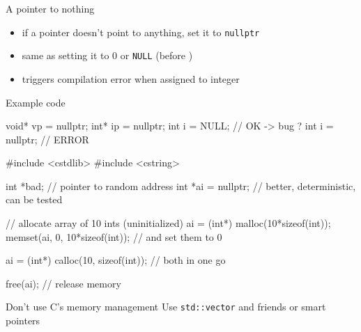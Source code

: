 \begin{frame}[fragile]
  \begin{block}{A pointer to nothing}
    \begin{itemize}
    \item if a pointer doesn't point to anything, set it to \texttt{nullptr}
    \item same as setting it to 0 or \texttt{NULL} (before )
    \item triggers compilation error when assigned to integer
    \end{itemize}
  \end{block}
  \pause
  \begin{exampleblock}{Example code}
    \begin{cppcode*}{}
      void* vp = nullptr;
      int* ip = nullptr;
      int i = NULL;      // OK -> bug ?
      int i = nullptr;   // ERROR
    \end{cppcode*}
  \end{exampleblock}
\end{frame}

\begin{frame}[fragile]
  \begin{cppcode}
    #include <cstdlib>
    #include <cstring>

    int *bad;          // pointer to random address
    int *ai = nullptr; // better, deterministic, can be tested

    // allocate array of 10 ints (uninitialized)
    ai = (int*) malloc(10*sizeof(int));
    memset(ai, 0, 10*sizeof(int)); // and set them to 0

    ai = (int*) calloc(10, sizeof(int)); // both in one go

    free(ai); // release memory
  \end{cppcode}
  \begin{goodpractice}{Don't use C's memory management}
    Use \texttt{std::vector} and friends or smart pointers
  \end{goodpractice}
\end{frame}
